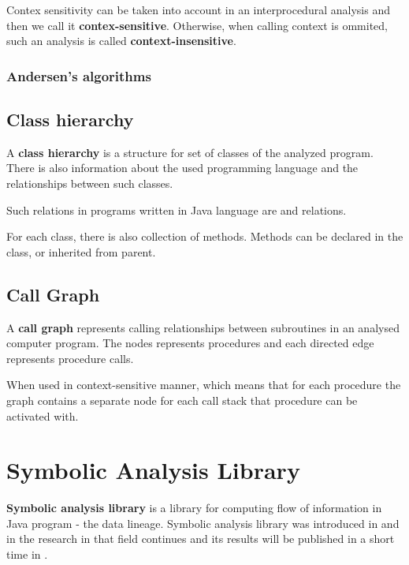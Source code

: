 Contex sensitivity can be taken into account in an interprocedural analysis and
then we call it \textbf{contex-sensitive}. Otherwise, when calling context is ommited,
such an analysis is called \textbf{context-insensitive}.




\subsubsection{Andersen's algorithms}





\subsection{Class hierarchy}

A \textbf{class hierarchy} is a structure for set of classes
of the analyzed program. There is also information about the used
programming language and the relationships between such classes.

Such relations in programs written in Java language are  and 
relations.

For each class, there is also collection of methods. Methods can be declared in the
class, or inherited from parent.



\subsection{Call Graph}

A \textbf{call graph} represents calling relationships between subroutines
in an analysed computer program. The nodes represents procedures and each
directed edge represents procedure calls.

When used in context-sensitive manner, which means that for each procedure 
the graph contains a separate node for each call stack that procedure can be
activated with.




\section{Symbolic Analysis Library}

\textbf{Symbolic analysis library} is a library for computing flow of information
in Java program - the data lineage.
Symbolic analysis library was introduced in \citet{ParizekHybridAnalysis}
and in the research in that field continues and its results will be published
in a short time in \citet{ParizekBUBEN}.

